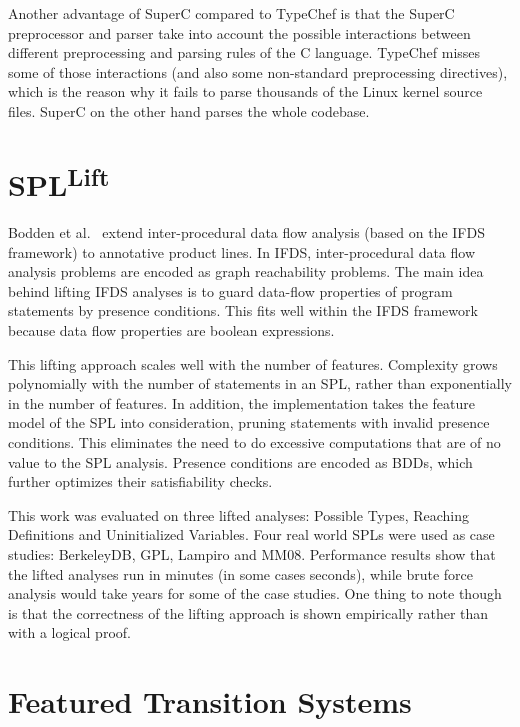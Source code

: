\documentclass[11pt]{article}
\begin{document}
Another advantage of SuperC compared to TypeChef is that the SuperC preprocessor and parser take into account the possible interactions between different preprocessing and parsing rules of the C language. TypeChef misses some of those interactions (and also some non-standard preprocessing directives), which is the reason why it fails to parse thousands of the Linux kernel source files. SuperC on the other hand parses the whole codebase.

\newcommand{\spllift}{SPL\textsuperscript{Lift}}

\section{\spllift}

Bodden et al.~\cite{Bodden:2013} extend inter-procedural data flow analysis (based on the IFDS~\cite{Reps:1995} framework) to annotative product lines. In IFDS, inter-procedural data flow analysis problems are encoded as graph reachability problems. The main idea behind lifting IFDS analyses is to guard data-flow properties of program statements by presence conditions. This fits well within the IFDS framework because data flow properties are boolean expressions.

This lifting approach scales well with the number of features. Complexity grows polynomially with the number of statements in an SPL, rather than exponentially in the number of features. In addition, the implementation takes the feature model of the SPL into consideration, pruning statements with invalid presence conditions. This eliminates the need to do excessive computations that are of no value to the SPL analysis. Presence conditions are encoded as BDDs, which further optimizes their satisfiability checks.

This work was evaluated on three lifted analyses: Possible Types, Reaching Definitions and Uninitialized Variables. Four real world SPLs were used as case studies: BerkeleyDB, GPL, Lampiro and MM08. Performance results show that the lifted analyses run in minutes (in some cases seconds), while brute force analysis would take years for some of the case studies. One thing to note though is that the correctness of the lifting approach is shown empirically rather than with a logical proof.

\section{Featured Transition Systems}
\end{document}
